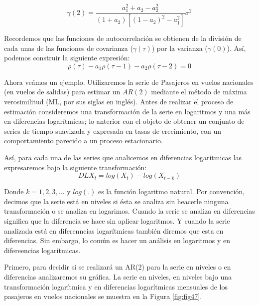 \documentclass[
]{book}
\begin{document}
\begin{equation}
    \gamma(2) = \frac{a^2_1 + a_2 - a^2_2}{(1 + a_2)[(1 - a_2)^2 - a^2_1]} \sigma^2
\end{equation}

Recordemos que las funciones de autocorrelación se obtienen de la división de cada unas de las funciones de covarianza (\(\gamma(\tau)\)) por la varianza (\(\gamma(0)\)). Así, podemos construir la siguiente expresión:
\begin{equation}
    \rho(\tau) - a_1 \rho(\tau - 1) - a_2 \rho(\tau - 2) = 0
\end{equation}

Ahora veámos un ejemplo. Utilizaremos la serie de Pasajeros en vuelos nacionales (en vuelos de salidas) para estimar un \(AR(2)\) mediante el método de máxima verosimilitud (ML, por sus siglas en inglés). Antes de realizar el proceso de estimación consideremos una transformación de la serie en logaritmos y una más en diferencias logarítmicas; lo anterior con el objeto de obtener un conjunto de series de tiempo suavizada y expresada en tasas de crecimiento, con un comportamiento parecido a un proceso estacionario.

Así, para cada una de las series que analicemos en diferencias logarítmicas las expresaremos bajo la siguiente transformación:
\begin{equation*}
    DLX_t = log(X_t) - log(X_{t-k})
\end{equation*}

Donde \(k = 1, 2, 3, \ldots\) y \(log(.)\) es la función logaritmo natural. Por convención, decimos que la serie está en niveles si ésta se analiza sin heacerle ninguna transformación o se analiza en logarimos. Cuando la serie se analiza en diferencias significa que la diferencia se hace sin aplicar logaritmos. Y cuando la serie analizada está en diferenncias logarítmicas también diremos que esta en diferencias. Sin embargo, lo común es hacer un análisis en logaritmos y en difereencias logarítmicas.

Primero, para decidir si se realizará un AR(2) para la serie en niveles o en diferencias analizaremos su gráfica. La serie en niveles, en niveles bajo una transformación logarítmica y en diferencias logarítmicas mensuales de los pasajeros en vuelos nacionales se muestra en la Figura \ref{fig:fig47}.
\end{document}
